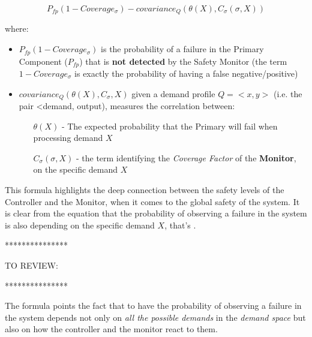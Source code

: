 \begin{equation}
P_{fp} (1 - Coverage_{\sigma}) - covariance_{Q} (\theta (X), C_{\sigma} (\sigma , X))
\end{equation}

where:

\begin{itemize}
	\item $P_{fp} (1 - Coverage_{\sigma})$ is the probability of a failure in the Primary Component ($P_{fp}$) that is \textbf{not detected} by the Safety Monitor (the term $1 - Coverage_{\sigma}$ is exactly the probability of having a false negative/positive)
	\item $covariance_{Q} (\theta (X), C_{\sigma}, X)$ given a demand profile $Q = <x, y>$ (i.e. the pair <demand, output), measures the correlation between:
	\begin{itemize}
		\item[$\theta (X)$ -] The expected probability that the Primary will fail when processing demand $X$
		\item[$C_{\sigma} (\sigma, X)$ -] the term identifying the \textsl{Coverage Factor} of the \textbf{Monitor}, on the specific demand $X$
	\end{itemize}
\end{itemize}

This formula highlights the deep connection between the safety levels of the Controller and the Monitor, when it comes to the global safety of the system. It is clear from the equation that the probability of observing a failure in the system is also depending on the specific demand $X$, that's 
.\newline

***************\newline

TO REVIEW:\newline

***************\newline

The formula points the fact that to have the probability of observing a failure in the system depends not only on \textsl{all the possible demands} in the \textsl{demand space} but also on how the controller and the monitor react to them.\newline


